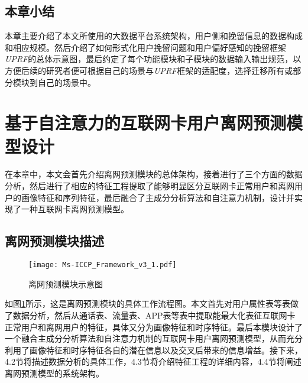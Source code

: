 \subsection{本章小结}
本章主要介绍了本文所使用的大数据平台系统架构，用户侧和挽留信息的数据构成和相应规模。然后介绍了如何形式化用户挽留问题和用户偏好感知的挽留框架\emph{UPRF}的总体示意图，最后约定了每个功能模块和子模块的数据输入输出规范，以方便后续的研究者便可根据自己的场景与\emph{UPRF}框架的适配度，选择迁移所有或部分模块到自己的场景中。


\newpage

\section{基于自注意力的互联网卡用户离网预测模型设计}
在本章中，本文会首先介绍离网预测模块的总体架构，接着进行了三个方面的数据分析，然后进行了相应的特征工程提取了能够明显区分互联网卡正常用户和离网用户的画像特征和序列特征，最后融合了主成分分析算法和自注意力机制，设计并实现了一种互联网卡离网预测模型。

\subsection{离网预测模块描述}
\begin{figure}[!hbt]
	\centering
	\texttt{[image: Ms-ICCP\_Framework\_v3\_1.pdf]}
	\caption{离网预测模块示意图}
	\label{Fig:Churn-Prediction-Module}
\end{figure}
如图\ref{Fig:Churn-Prediction-Module}所示，这是离网预测模块的具体工作流程图。本文首先对用户属性表等表做了数据分析，然后从通话表、流量表、APP表等表中提取能最大化表征互联网卡正常用户和离网用户的特征，具体又分为画像特征和时序特征。最后本模块设计了一个融合主成分分析算法和自注意力机制的互联网卡用户离网预测模型，从而充分利用了画像特征和时序特征各自的潜在信息以及交叉后带来的信息增益。接下来，4.2节将描述数据分析的具体工作，4.3节将介绍特征工程的详细内容，4.4节将阐述离网预测模型的系统架构。

